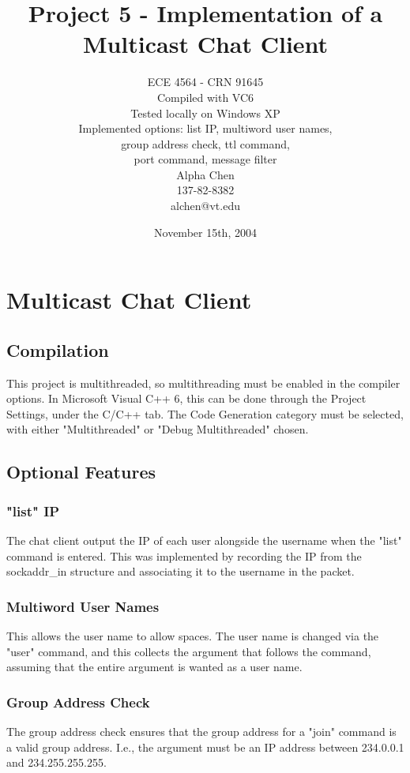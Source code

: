 \documentclass[11pt]{report}
\title{Project 5 - Implementation of a Multicast Chat Client}
\author{ECE 4564 - CRN 91645\\
Compiled with VC6\\
Tested locally on Windows XP\\
Implemented options: list IP, multiword user names,\\
group address check, ttl command,\\
port command, message filter \\ 
Alpha Chen\\
137-82-8382\\
alchen@vt.edu}
\date{November 15th, 2004}
\begin{document}
\maketitle

\chapter{Multicast Chat Client}

\section{Compilation}

This project is multithreaded, so multithreading must be enabled in the compiler options. In Microsoft Visual C++ 6, this can be done through the Project Settings, under the C/C++ tab. The Code Generation category must be selected, with either "Multithreaded" or "Debug Multithreaded" chosen.

\section{Optional Features}

\subsection{"list" IP}

The chat client output the IP of each user alongside the username when the "list" command is entered. This was implemented by recording the IP from the sockaddr\_in structure and associating it to the username in the packet.

\subsection{Multiword User Names}

This allows the user name to allow spaces. The user name is changed via the "user" command, and this collects the argument that follows the command, assuming that the entire argument is wanted as a user name.

\subsection{Group Address Check}

The group address check ensures that the group address for a "join" command is a valid group address. I.e., the argument must be an IP address between 234.0.0.1 and 234.255.255.255.
\end{document}
